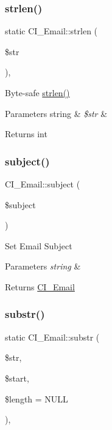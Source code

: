 \subsubsection{\texorpdfstring{strlen()}{strlen()}}
{\footnotesize\ttfamily static C\+I\+\_\+\+Email\+::strlen (\begin{DoxyParamCaption}\item[{}]{\$str }\end{DoxyParamCaption})\hspace{0.3cm}{\ttfamily [static]}, {\ttfamily [protected]}}

Byte-\/safe \mbox{\hyperlink{class_c_i___email_a97a496ca5086c4ff8e42453cb4df46f6}{strlen()}}


\begin{DoxyParams}[1]{Parameters}
string & {\em \$str} & \\
\hline
\end{DoxyParams}
\begin{DoxyReturn}{Returns}
int 
\end{DoxyReturn}
\mbox{\label{class_c_i___email_a14795b95ebaa3941a2c5a11ee7ddbeae}} 
\subsubsection{\texorpdfstring{subject()}{subject()}}
{\footnotesize\ttfamily C\+I\+\_\+\+Email\+::subject (\begin{DoxyParamCaption}\item[{}]{\$subject }\end{DoxyParamCaption})}

Set Email Subject


\begin{DoxyParams}{Parameters}
{\em string} & \\
\hline
\end{DoxyParams}
\begin{DoxyReturn}{Returns}
\mbox{\hyperlink{class_c_i___email}{C\+I\+\_\+\+Email}} 
\end{DoxyReturn}
\mbox{\label{class_c_i___email_a8e89566d4fe484c4fa47d2c6ce323a58}} 
\subsubsection{\texorpdfstring{substr()}{substr()}}
{\footnotesize\ttfamily static C\+I\+\_\+\+Email\+::substr (\begin{DoxyParamCaption}\item[{}]{\$str,  }\item[{}]{\$start,  }\item[{}]{\$length = {\ttfamily NULL} }\end{DoxyParamCaption})\hspace{0.3cm}{\ttfamily [static]}, {\ttfamily [protected]}}

